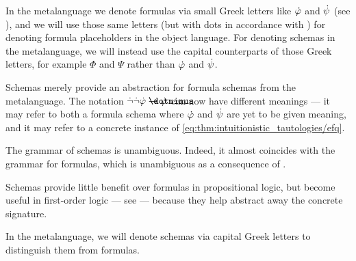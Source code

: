 \begin{comments}
  \item In the metalanguage we denote formulas via small Greek letters like \( \dot{\varphi} \) and \( \dot{\psi} \) (see ), and we will use those same letters (but with dots in accordance with ) for denoting formula placeholders in the object language. For denoting schemas in the metalanguage, we will instead use the capital counterparts of those Greek letters, for example \( \Phi \) and \( \Psi \) rather than \( \dot{\varphi} \) and \( \dot{\psi} \).
  \item Schemas merely provide an abstraction for formula schemas from the metalanguage. The notation \( \synneg \synneg \syn\varphi \synimplies \syn\varphi \) can now have different meanings --- it may refer to both a formula schema where \( \dot{\varphi} \) and \( \dot{\psi} \) are yet to be given meaning, and it may refer to a concrete instance of \eqref{eq:thm:intuitionistic_tautologies/efq}.
  \item The grammar of schemas is unambiguous. Indeed, it almost coincides with the grammar for formulas, which is unambiguous as a consequence of .
  \item Schemas provide little benefit over formulas in propositional logic, but become useful in first-order logic --- see  --- because they help abstract away the concrete signature.
  \item In the metalanguage, we will denote schemas via capital Greek letters to distinguish them from formulas.
\end{comments}

